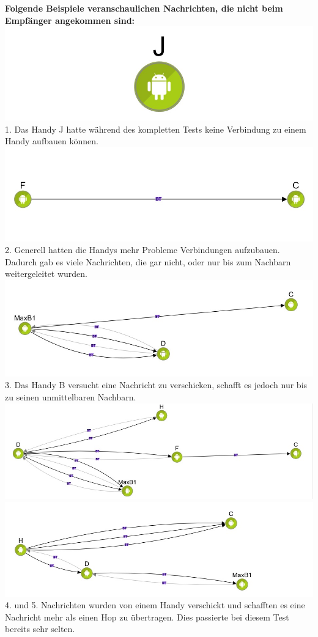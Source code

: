 \textbf{Folgende Beispiele veranschaulichen Nachrichten, die nicht beim
Empfänger angekommen sind:}
\includegraphics[width=1.0\textwidth]{belege/grosstests/Bilder/Test2Misserfolg1.jpg} 1. Das
Handy J hatte während des kompletten Tests keine Verbindung zu einem
Handy aufbauen können.
\includegraphics[width=1.0\textwidth]{belege/grosstests/Bilder/Test2Misserfolg3.jpg} 2.
Generell hatten die Handys mehr Probleme Verbindungen aufzubauen.
Dadurch gab es viele Nachrichten, die gar nicht, oder nur bis zum
Nachbarn weitergeleitet wurden.
\includegraphics[width=1.0\textwidth]{belege/grosstests/Bilder/Test2Misserfolg4.jpg} 3. Das
Handy B versucht eine Nachricht zu verschicken, schafft es jedoch nur
bis zu seinen unmittelbaren Nachbarn.
\includegraphics[width=1.0\textwidth]{belege/grosstests/Bilder/Test2Misserfolg5.jpg}
\includegraphics[width=1.0\textwidth]{belege/grosstests/Bilder/Test2Misserfolg6.jpg} 4. und
5. Nachrichten wurden von einem Handy verschickt und schafften es eine
Nachricht mehr als einen Hop zu übertragen. Dies passierte bei diesem
Test bereits sehr selten.

